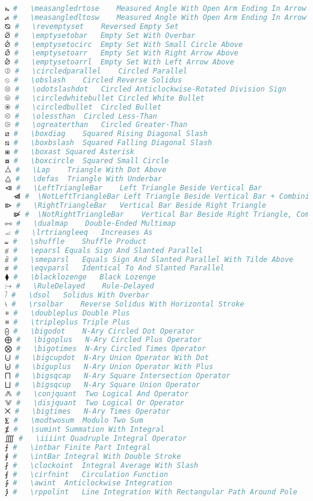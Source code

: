\begin{lstlisting}[language=Julia, style=julia, linewidth=\textwidth]
⦮ #   \measangledrtose    Measured Angle With Open Arm Ending In Arrow Right And Down
⦯ #   \measangledltosw    Measured Angle With Open Arm Ending In Arrow Left And Down
⦰ #   \revemptyset    Reversed Empty Set
⦱ #   \emptysetobar   Empty Set With Overbar
⦲ #   \emptysetocirc  Empty Set With Small Circle Above
⦳ #   \emptysetoarr   Empty Set With Right Arrow Above
⦴ #   \emptysetoarrl  Empty Set With Left Arrow Above
⦷ #   \circledparallel    Circled Parallel
⦸ #   \obslash    Circled Reverse Solidus
⦼ #   \odotslashdot   Circled Anticlockwise-Rotated Division Sign
⦾ #   \circledwhitebullet Circled White Bullet
⦿ #   \circledbullet  Circled Bullet
⧀ #   \olessthan  Circled Less-Than
⧁ #   \ogreaterthan   Circled Greater-Than
⧄ #   \boxdiag    Squared Rising Diagonal Slash
⧅ #   \boxbslash  Squared Falling Diagonal Slash
⧆ #   \boxast Squared Asterisk
⧇ #   \boxcircle  Squared Small Circle
⧊ #   \Lap    Triangle With Dot Above
⧋ #   \defas  Triangle With Underbar
⧏ #   \LeftTriangleBar    Left Triangle Beside Vertical Bar
  ⧏̸ #  \NotLeftTriangleBar Left Triangle Beside Vertical Bar + Combining Long Solidus Overlay / Non-Spacing Long Slash Overlay
⧐ #   \RightTriangleBar   Vertical Bar Beside Right Triangle
  ⧐̸ #  \NotRightTriangleBar    Vertical Bar Beside Right Triangle, Combining Long Solidus
⧟ #   \dualmap    Double-Ended Multimap
⧡ #   \lrtriangleeq   Increases As
⧢ #   \shuffle    Shuffle Product
⧣ #   \eparsl Equals Sign And Slanted Parallel
⧤ #   \smeparsl   Equals Sign And Slanted Parallel With Tilde Above
⧥ #   \eqvparsl   Identical To And Slanted Parallel
⧫ #   \blacklozenge   Black Lozenge
⧴ #   \RuleDelayed    Rule-Delayed
⧶ #   \dsol   Solidus With Overbar
⧷ #   \rsolbar    Reverse Solidus With Horizontal Stroke
⧺ #   \doubleplus Double Plus
⧻ #   \tripleplus Triple Plus
⨀ #   \bigodot    N-Ary Circled Dot Operator
⨁ #   \bigoplus   N-Ary Circled Plus Operator
⨂ #   \bigotimes  N-Ary Circled Times Operator
⨃ #   \bigcupdot  N-Ary Union Operator With Dot
⨄ #   \biguplus   N-Ary Union Operator With Plus
⨅ #   \bigsqcap   N-Ary Square Intersection Operator
⨆ #   \bigsqcup   N-Ary Square Union Operator
⨇ #   \conjquant  Two Logical And Operator
⨈ #   \disjquant  Two Logical Or Operator
⨉ #   \bigtimes   N-Ary Times Operator
⨊ #   \modtwosum  Modulo Two Sum
⨋ #   \sumint Summation With Integral
⨌ #   \iiiint Quadruple Integral Operator
⨍ #   \intbar Finite Part Integral
⨎ #   \intBar Integral With Double Stroke
⨏ #   \clockoint  Integral Average With Slash
⨐ #   \cirfnint   Circulation Function
⨑ #   \awint  Anticlockwise Integration
⨒ #   \rppolint   Line Integration With Rectangular Path Around Pole

\end{lstlisting}
